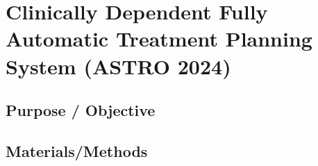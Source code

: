 


\section{Clinically Dependent Fully Automatic Treatment Planning System (ASTRO 2024)}
\subsection{Purpose / Objective}

\subsection{Materials/Methods}

